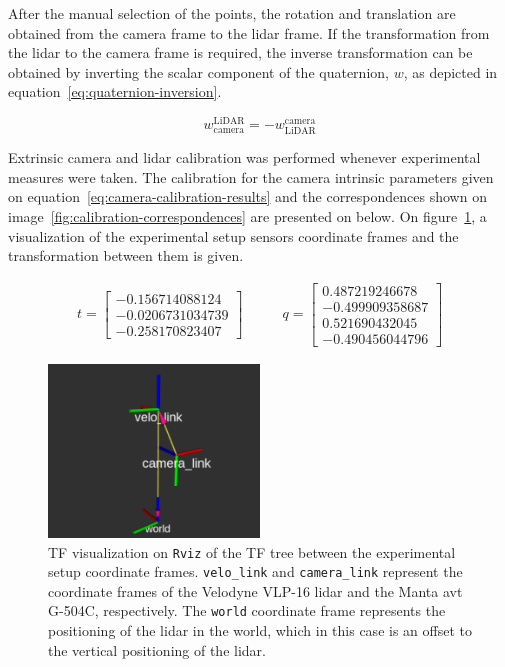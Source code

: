 After the manual selection of the points, the rotation and translation are obtained from the camera frame to the \ac{lidar} frame. If the transformation from the \ac{lidar} to the camera frame is required, the inverse transformation can be obtained by inverting the scalar component of the quaternion, $w$, as depicted in equation~\eqref{eq:quaternion-inversion}. 

\begin{equation}
	\label{eq:quaternion-inversion}
	w^\text{LiDAR}_\text{camera} = - w^\text{camera}_\text{LiDAR}
\end{equation}

Extrinsic camera and \ac{lidar} calibration was performed whenever experimental measures were taken. The calibration for the camera intrinsic parameters given on equation~\ref{eq:camera-calibration-results} and the correspondences shown on image~\ref{fig:calibration-correspondences} are presented on below. On figure~\ref{fig:extrinsic-calibration-frames}, a visualization of the experimental setup sensors coordinate frames and the transformation between them is given.

\begin{subequations}
	\label{eq:camera-to-lidar-transform}
	\begin{align}
		t = \begin{bmatrix}
			-0.156714088124  \\
			-0.0206731034739 \\
			-0.258170823407
		\end{bmatrix} \nonumber
		& \qquad
		q = \begin{bmatrix} 
		0.487219246678  \\
		-0.499909358687 \\
		0.521690432045  \\
		-0.490456044796
	\end{bmatrix} \nonumber
	\end{align}
\end{subequations}

\begin{figure}[H]
	\centering
	\includegraphics[width=0.5\textwidth]{img/calibration/extrinsic-calibration-frames.png}
	\caption{TF visualization on \texttt{Rviz} of the TF tree between the experimental setup coordinate frames. \texttt{velo\_link} and \texttt{camera\_link} represent the coordinate frames of the Velodyne VLP-16 \ac{lidar} and the Manta \ac{avt} G-504C, respectively. The \texttt{world} coordinate frame represents the positioning of the \ac{lidar} in the world, which in this case is an offset to the vertical positioning of the \ac{lidar}.}
	\label{fig:extrinsic-calibration-frames}
\end{figure}

